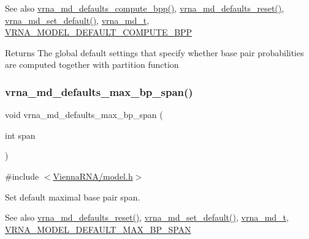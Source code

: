 \begin{DoxySeeAlso}{See also}
\hyperlink{group__model__details_gaf1b5db10f1f476767f9a95f8a78e3132}{vrna\+\_\+md\+\_\+defaults\+\_\+compute\+\_\+bpp()}, \hyperlink{group__model__details_ga70834424cf804d149937de89f80ceb45}{vrna\+\_\+md\+\_\+defaults\+\_\+reset()}, \hyperlink{group__model__details_ga8ac6ff84936282436f822644bf841f66}{vrna\+\_\+md\+\_\+set\+\_\+default()}, \hyperlink{group__model__details_ga1f8a10e12a0a1915f2a4eff0b28ea17c}{vrna\+\_\+md\+\_\+t}, \hyperlink{group__model__details_ga1d6cd5051940b126c248147c011bac6c}{V\+R\+N\+A\+\_\+\+M\+O\+D\+E\+L\+\_\+\+D\+E\+F\+A\+U\+L\+T\+\_\+\+C\+O\+M\+P\+U\+T\+E\+\_\+\+B\+PP} 
\end{DoxySeeAlso}
\begin{DoxyReturn}{Returns}
The global default settings that specify whether base pair probabilities are computed together with partition function 
\end{DoxyReturn}
\mbox{\label{group__model__details_ga4c4bc962f09b4480cb8499f1cf8ae4ec}} 
\subsubsection{\texorpdfstring{vrna\+\_\+md\+\_\+defaults\+\_\+max\+\_\+bp\+\_\+span()}{vrna\_md\_defaults\_max\_bp\_span()}}
{\footnotesize\ttfamily void vrna\+\_\+md\+\_\+defaults\+\_\+max\+\_\+bp\+\_\+span (\begin{DoxyParamCaption}\item[{int}]{span }\end{DoxyParamCaption})}



{\ttfamily \#include $<$\hyperlink{model_8h}{Vienna\+R\+N\+A/model.\+h}$>$}



Set default maximal base pair span. 

\begin{DoxySeeAlso}{See also}
\hyperlink{group__model__details_ga70834424cf804d149937de89f80ceb45}{vrna\+\_\+md\+\_\+defaults\+\_\+reset()}, \hyperlink{group__model__details_ga8ac6ff84936282436f822644bf841f66}{vrna\+\_\+md\+\_\+set\+\_\+default()}, \hyperlink{group__model__details_ga1f8a10e12a0a1915f2a4eff0b28ea17c}{vrna\+\_\+md\+\_\+t}, \hyperlink{group__model__details_ga7cb6f4ae8fdebff6746a4410814f2977}{V\+R\+N\+A\+\_\+\+M\+O\+D\+E\+L\+\_\+\+D\+E\+F\+A\+U\+L\+T\+\_\+\+M\+A\+X\+\_\+\+B\+P\+\_\+\+S\+P\+AN} 
\end{DoxySeeAlso}

